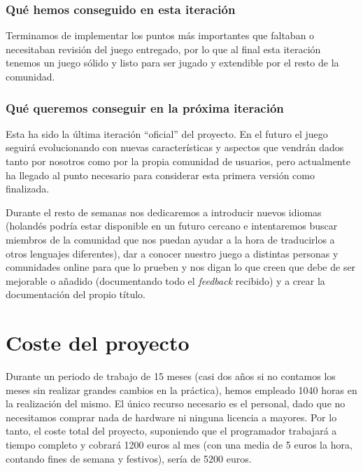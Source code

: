 \subsubsection{Qué hemos conseguido en esta iteración}

Terminamos de implementar los puntos más importantes que faltaban o necesitaban revisión del juego entregado, por lo que al final esta iteración tenemos un juego sólido y listo para ser jugado y extendible por el resto de la comunidad.

\subsubsection{Qué queremos conseguir en la próxima iteración}
Esta ha sido la última iteración ``oficial'' del proyecto. En el futuro el juego seguirá evolucionando con nuevas características y aspectos que vendrán dados tanto por nosotros como por la propia comunidad de usuarios, pero actualmente ha llegado al punto necesario para considerar esta primera versión como finalizada.

Durante el resto de semanas nos dedicaremos a introducir nuevos idiomas (holandés podría estar disponible en un futuro cercano e intentaremos buscar miembros de la comunidad que nos puedan ayudar a la hora de traducirlos a otros lenguajes diferentes), dar a conocer nuestro juego a distintas personas y comunidades online para que lo prueben y nos digan lo que creen que debe de ser mejorable o añadido (documentando todo el \textit{feedback} recibido) y a crear la documentación del propio título.

\section{Coste del proyecto}

Durante un periodo de trabajo de 15 meses (casi dos años si no contamos los meses sin realizar grandes cambios en la práctica), hemos empleado 1040 horas en la realización del mismo.
El único recurso necesario es el personal, dado que no necesitamos comprar nada de hardware ni ninguna licencia a mayores. Por lo tanto, el coste total del proyecto, suponiendo que el programador trabajará a tiempo completo y cobrará 1200 euros al mes (con una media de 5 euros la hora, contando fines de semana y festivos), sería de 5200 euros.